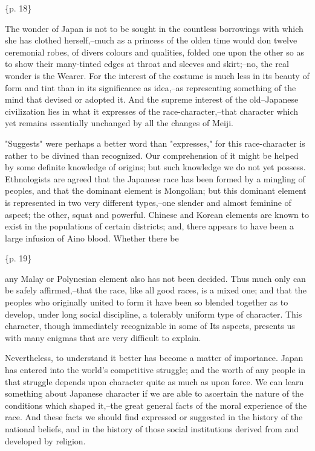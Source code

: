 \{p. 18\}

The wonder of Japan is not to be sought in the countless borrowings with which she has clothed herself,--much as a princess of the olden time would don twelve ceremonial robes, of divers colours and qualities, folded one upon the other so as to show their many-tinted edges at throat and sleeves and skirt;--no, the real wonder is the Wearer. For the interest of the costume is much less in its beauty of form and tint than in its significance as idea,--as representing something of the mind that devised or adopted it. And the supreme interest of the old--Japanese civilization lies in what it expresses of the race-character,--that character which yet remains essentially unchanged by all the changes of Meiji.

"Suggests" were perhaps a better word than "expresses," for this race-character is rather to be divined than recognized. Our comprehension of it might be helped by some definite knowledge of origins; but such knowledge we do not yet possess. Ethnologists are agreed that the Japanese race has been formed by a mingling of peoples, and that the dominant element is Mongolian; but this dominant element is represented in two very different types,--one slender and almost feminine of aspect; the other, squat and powerful. Chinese and Korean elements are known to exist in the populations of certain districts; and, there appears to have been a large infusion of Aino blood. Whether there be

\{p. 19\}

any Malay or Polynesian element also has not been decided. Thus much only can be safely affirmed,--that the race, like all good races, is a mixed one; and that the peoples who originally united to form it have been so blended together as to develop, under long social discipline, a tolerably uniform type of character. This character, though immediately recognizable in some of Its aspects, presents us with many enigmas that are very difficult to explain.

Nevertheless, to understand it better has become a matter of importance. Japan has entered into the world's competitive struggle; and the worth of any people in that struggle depends upon character quite as much as upon force. We can learn something about Japanese character if we are able to ascertain the nature of the conditions which shaped it,--the great general facts of the moral experience of the race. And these facts we should find expressed or suggested in the history of the national beliefs, and in the history of those social institutions derived from and developed by religion.

